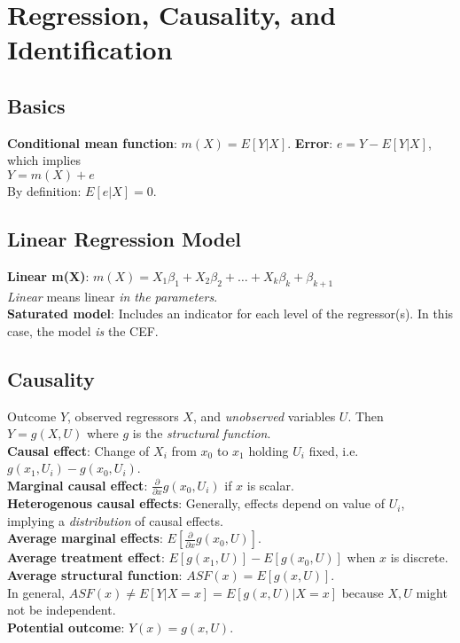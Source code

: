 \section{Regression, Causality, and Identification}
\subsection{Basics}
\textbf{Conditional mean function}: $m(X) = E[Y|X]$.
\textbf{Error}: $e = Y - E[Y|X]$, which implies\\
$Y = m(X) + e$ \\
By definition: $E[e|X] = 0$.

\subsection{Linear Regression Model}
\textbf{Linear m(X)}: $m(X) = X_1\beta_1 + X_2\beta_2 + \ldots + X_k\beta_k + \beta_{k+1}$\\
\textit{Linear} means linear \textit{in the parameters}.\\
\textbf{Saturated model}: Includes an indicator for each level of the regressor(s). In this case, the model \textit{is} the CEF.

\subsection{Causality}
Outcome $Y$, observed regressors $X$, and \textit{unobserved} variables $U$. Then $Y = g(X,U)$ where $g$ is the \textit{structural function}.\\
\textbf{Causal effect}: Change of $X_i$ from $x_0$ to $x_1$ holding $U_i$ fixed, i.e. $g(x_1, U_i) - g(x_0, U_i)$.\\
\textbf{Marginal causal effect}: $\frac{\partial}{\partial x}g(x_0, U_i)$ if $x$ is scalar.\\
\textbf{Heterogenous causal effects}: Generally, effects depend on value of $U_i$, implying a \textit{distribution} of causal effects.\\
\textbf{Average marginal effects}: $E[\frac{\partial}{\partial x}g(x_0, U)]$.\\
\textbf{Average treatment effect}: $E[g(x_1, U)] - E[g(x_0, U)]$ when $x$ is discrete.\\
\textbf{Average structural function}: $ASF(x) = E[g(x,U)]$. \\
In general, $ASF(x) \neq E[Y|X=x] = E[g(x, U)|X=x]$ because $X, U$ might not be independent.\\
\textbf{Potential outcome}: $Y(x) = g(x,U)$.\\

